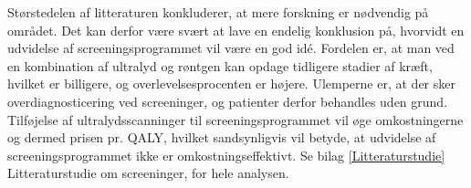 Størstedelen af litteraturen konkluderer, at mere forskning er nødvendig på området. Det kan derfor være svært at lave en endelig konklusion på, hvorvidt en udvidelse af screeningsprogrammet vil være en god idé. Fordelen er, at man ved en kombination af ultralyd og røntgen kan opdage tidligere stadier af kræft, hvilket er billigere, og overlevelsesprocenten er højere. Ulemperne er, at der sker overdiagnosticering ved screeninger, og patienter derfor behandles uden grund. Tilføjelse af ultralydsscanninger til screeningsprogrammet vil øge omkostningerne og dermed prisen pr. QALY, hvilket sandsynligvis vil betyde, at udvidelse af screeningsprogrammet ikke er omkostningseffektivt. Se bilag \ref{Litteraturstudie} Litteraturstudie om screeninger, for hele analysen. 
